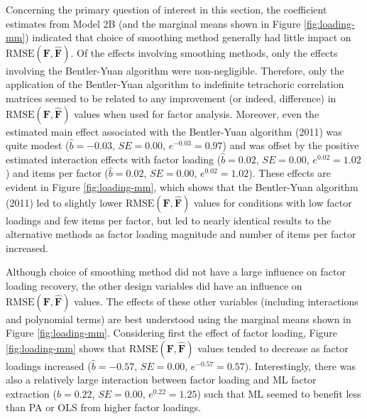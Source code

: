\documentclass[
  english,
  man]{apa6}
\begin{document}
Concerning the primary question of interest in this section, the coefficient estimates from Model 2B (and the marginal means shown in Figure \ref{fig:loading-mm}) indicated that choice of smoothing method generally had little impact on \(\textrm{RMSE}(\mathbf{F}, \hat{\mathbf{F}})\). Of the effects involving smoothing methods, only the effects involving the Bentler-Yuan algorithm were non-negligible. Therefore, only the application of the Bentler-Yuan algorithm to indefinite tetrachoric correlation matrices seemed to be related to any improvement (or indeed, difference) in \(\textrm{RMSE}(\mathbf{F}, \hat{\mathbf{F}})\) values when used for factor analysis. Moreover, even the estimated main effect associated with the Bentler-Yuan algorithm (2011) was quite modest (\(\hat{b} = -0.03\), \(SE = 0.00\), \(e^{-0.03} = 0.97\)) and was offset by the positive estimated interaction effects with factor loading (\(\hat{b} = 0.02\), \(SE = 0.00\), \(e^{0.02} = 1.02\)) and items per factor (\(\hat{b} = 0.02\), \(SE = 0.00\), \(e^{0.02} = 1.02\)). These effects are evident in Figure \ref{fig:loading-mm}, which shows that the Bentler-Yuan algorithm (2011) led to slightly lower \(\textrm{RMSE}(\mathbf{F}, \hat{\mathbf{F}})\) values for conditions with low factor loadings and few items per factor, but led to nearly identical results to the alternative methods as factor loading magnitude and number of items per factor increased.

Although choice of smoothing method did not have a large influence on factor loading recovery, the other design variables did have an influence on \(\textrm{RMSE}(\mathbf{F}, \hat{\mathbf{F}})\) values. The effects of these other variables (including interactions and polynomial terms) are best understood using the marginal means shown in Figure \ref{fig:loading-mm}. Considering first the effect of factor loading, Figure \ref{fig:loading-mm} shows that \(\textrm{RMSE}(\mathbf{F}, \hat{\mathbf{F}})\) values tended to decrease as factor loadings increased (\(\hat{b} = -0.57\), \(SE = 0.00\), \(e^{-0.57} = 0.57\)). Interestingly, there was also a relatively large interaction between factor loading and ML factor extraction (\(\hat{b} = 0.22\), \(SE = 0.00\), \(e^{0.22} = 1.25\)) such that ML seemed to benefit less than PA or OLS from higher factor loadings.
\end{document}
